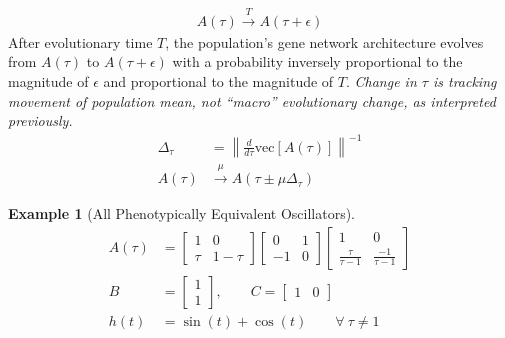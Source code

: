 \documentclass[9 pt]{article}
\newcommand{\jss}[1]{{\color{olive}\it #1}}
\newcommand{\1}{\mathbbm{1}}
\newtheorem{example}{Example}
\begin{document}
\begin{multicols}{2}
  \begin{align}
    A(\tau) \xrightarrow{T} A(\tau + \epsilon)
  \end{align}
  After evolutionary time $T$, the population's gene network architecture evolves from $A(\tau)$ to $A(\tau + \epsilon)$ with a probability inversely proportional to the magnitude of $\epsilon$ and proportional to the magnitude of $T$. 
\jss{Change in $\tau$ is tracking movement of population mean, not ``macro'' evolutionary change, as interpreted previously.}
  \begin{align}
    \Delta_{\tau} &= \left\lVert \frac{d}{d \tau} \text{vec} \left[A\left(\tau\right)\right] \right\rVert^{-1} \\
    A(\tau) &\xrightarrow{\mu} A(\tau \pm \mu \Delta_{\tau})
  \end{align}
  \begin{example}[All Phenotypically Equivalent Oscillators]
    \begin{align*}
      A(\tau) &= \begin{bmatrix} 1 & 0 \\ \tau & 1-\tau \end{bmatrix} \begin{bmatrix} 0 & 1 \\ -1 & 0 \end{bmatrix} \begin{bmatrix} 1 & 0 \\ \frac{\tau}{\tau-1} & \frac{-1}{\tau-1} \end{bmatrix} \\
        B &= \begin{bmatrix} 1 \\ 1 \end{bmatrix}, \qquad C = \begin{bmatrix} 1 & 0 \end{bmatrix} \\
          h(t) &= \sin(t) + \cos(t) \qquad \forall \ \tau \neq 1
    \end{align*}
    \begin{figure}[H]
    \centering
{}
\end{figure}
\end{example}
\end{multicols}
\end{document}
